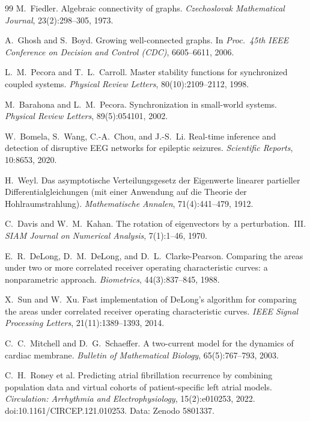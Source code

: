 ﻿\begin{thebibliography}{99}
 M.~Fiedler. Algebraic connectivity of graphs.
\emph{Czechoslovak Mathematical Journal}, 23(2):298--305, 1973.

 A.~Ghosh and S.~Boyd. Growing well-connected graphs. In
\emph{Proc.\ 45th IEEE Conference on Decision and Control (CDC)}, 6605--6611, 2006.

 L.~M.~Pecora and T.~L.~Carroll. Master stability functions
for synchronized coupled systems. \emph{Physical Review Letters},
80(10):2109--2112, 1998.

 M.~Barahona and L.~M.~Pecora. Synchronization in
small-world systems. \emph{Physical Review Letters}, 89(5):054101, 2002.

 W.~Bomela, S.~Wang, C.-A.~Chou, and J.-S.~Li. Real-time
inference and detection of disruptive EEG networks for epileptic seizures.
\emph{Scientific Reports}, 10:8653, 2020.

 H.~Weyl. Das asymptotische Verteilungsgesetz der Eigenwerte
linearer partieller Differentialgleichungen (mit einer Anwendung auf die Theorie
der Hohlraumstrahlung). \emph{Mathematische Annalen},
71(4):441--479, 1912.

 C.~Davis and W.~M.~Kahan. The rotation of eigenvectors
by a perturbation.\ III. \emph{SIAM Journal on Numerical Analysis}, 7(1):1--46, 1970.

 E.~R.~DeLong, D.~M.~DeLong, and D.~L.~Clarke-Pearson.
Comparing the areas under two or more correlated receiver operating
characteristic curves: a nonparametric approach. \emph{Biometrics},
44(3):837--845, 1988.

 X.~Sun and W.~Xu. Fast implementation of DeLong's algorithm
for comparing the areas under correlated receiver operating characteristic
curves. \emph{IEEE Signal
Processing Letters}, 21(11):1389--1393, 2014.

 C.~C.~Mitchell and D.~G.~Schaeffer. A two-current model
for the dynamics of cardiac membrane. \emph{Bulletin of Mathematical Biology},
65(5):767--793, 2003.

 C.~H.~Roney et al. Predicting atrial fibrillation recurrence
by combining population data and virtual cohorts of patient-specific left atrial
models. \emph{Circulation: Arrhythmia and Electrophysiology}, 15(2):e010253, 2022.
doi:10.1161/CIRCEP.121.010253. Data: Zenodo 5801337.


\end{thebibliography}
